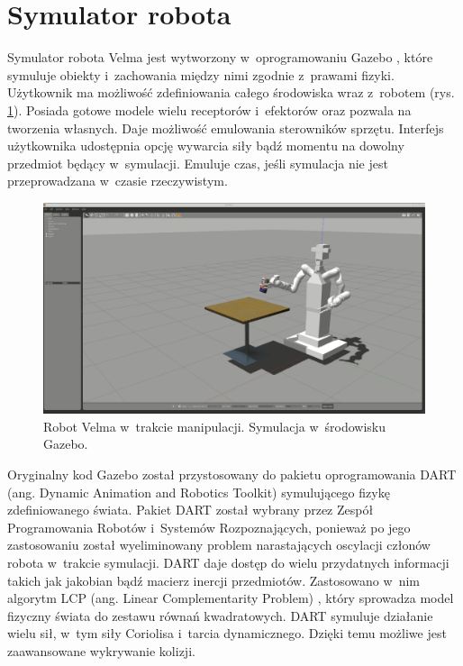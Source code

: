 	\section{Symulator robota}
	Symulator robota Velma jest wytworzony w~oprogramowaniu Gazebo \cite{bib:Gazebo}, które symuluje obiekty i~zachowania między nimi zgodnie z~prawami fizyki. Użytkownik ma możliwość zdefiniowania całego środowiska wraz z~robotem (rys. \ref{fig:gazebo}). Posiada gotowe modele wielu receptorów i~efektorów oraz pozwala na tworzenia własnych. Daje możliwość emulowania sterowników sprzętu. Interfejs użytkownika udostępnia opcję wywarcia siły bądź momentu na dowolny przedmiot będący w~symulacji. Emuluje czas, jeśli symulacja nie jest przeprowadzana w~czasie rzeczywistym.
	
	\begin{figure}
		\centering
		\includegraphics[width=.6\textwidth]{images/gazebo.png}
		\caption{Robot Velma w~trakcie manipulacji. Symulacja w~środowisku Gazebo.}
		\label{fig:gazebo}
	\end{figure}

	Oryginalny kod Gazebo został przystosowany do pakietu oprogramowania DART (ang. Dynamic Animation and Robotics Toolkit) \cite{bib:dart} symulującego fizykę zdefiniowanego świata. Pakiet DART został wybrany przez Zespół Programowania Robotów i~Systemów Rozpoznających, ponieważ po jego zastosowaniu został wyeliminowany problem narastających oscylacji członów robota w~trakcie symulacji. DART daje dostęp do wielu przydatnych informacji takich jak jakobian bądź macierz inercji przedmiotów. Zastosowano w~nim algorytm LCP (ang. Linear Complementarity Problem) \cite{bib:lpcBase}, który sprowadza model fizyczny świata do zestawu równań kwadratowych. DART symuluje działanie wielu sił, w~tym siły Coriolisa i~tarcia dynamicznego. Dzięki temu możliwe jest zaawansowane wykrywanie kolizji. 
	
	